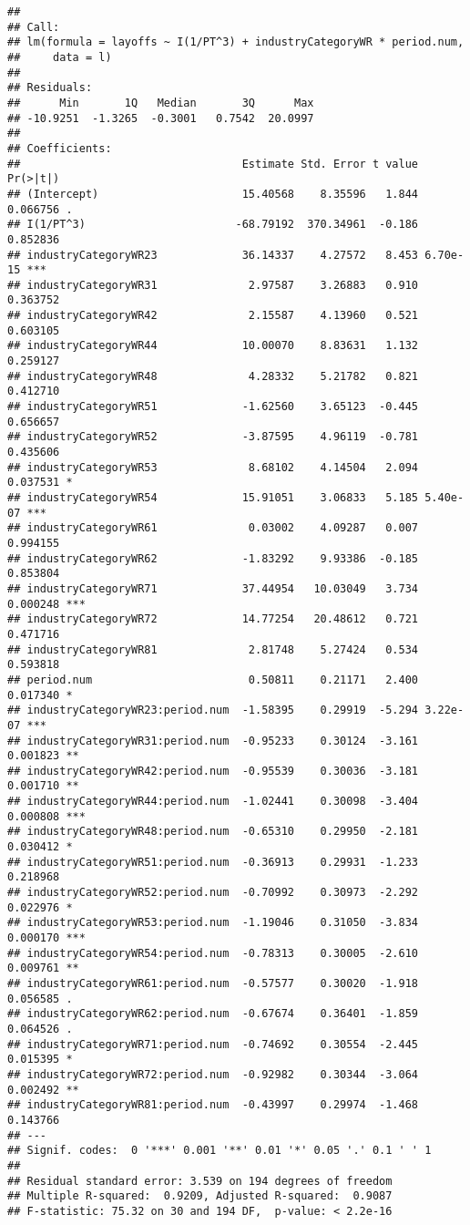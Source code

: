 \documentclass[
]{article}
\begin{document}
\begin{verbatim}
## 
## Call:
## lm(formula = layoffs ~ I(1/PT^3) + industryCategoryWR * period.num, 
##     data = l)
## 
## Residuals:
##      Min       1Q   Median       3Q      Max 
## -10.9251  -1.3265  -0.3001   0.7542  20.0997 
## 
## Coefficients:
##                                  Estimate Std. Error t value Pr(>|t|)    
## (Intercept)                      15.40568    8.35596   1.844 0.066756 .  
## I(1/PT^3)                       -68.79192  370.34961  -0.186 0.852836    
## industryCategoryWR23             36.14337    4.27572   8.453 6.70e-15 ***
## industryCategoryWR31              2.97587    3.26883   0.910 0.363752    
## industryCategoryWR42              2.15587    4.13960   0.521 0.603105    
## industryCategoryWR44             10.00070    8.83631   1.132 0.259127    
## industryCategoryWR48              4.28332    5.21782   0.821 0.412710    
## industryCategoryWR51             -1.62560    3.65123  -0.445 0.656657    
## industryCategoryWR52             -3.87595    4.96119  -0.781 0.435606    
## industryCategoryWR53              8.68102    4.14504   2.094 0.037531 *  
## industryCategoryWR54             15.91051    3.06833   5.185 5.40e-07 ***
## industryCategoryWR61              0.03002    4.09287   0.007 0.994155    
## industryCategoryWR62             -1.83292    9.93386  -0.185 0.853804    
## industryCategoryWR71             37.44954   10.03049   3.734 0.000248 ***
## industryCategoryWR72             14.77254   20.48612   0.721 0.471716    
## industryCategoryWR81              2.81748    5.27424   0.534 0.593818    
## period.num                        0.50811    0.21171   2.400 0.017340 *  
## industryCategoryWR23:period.num  -1.58395    0.29919  -5.294 3.22e-07 ***
## industryCategoryWR31:period.num  -0.95233    0.30124  -3.161 0.001823 ** 
## industryCategoryWR42:period.num  -0.95539    0.30036  -3.181 0.001710 ** 
## industryCategoryWR44:period.num  -1.02441    0.30098  -3.404 0.000808 ***
## industryCategoryWR48:period.num  -0.65310    0.29950  -2.181 0.030412 *  
## industryCategoryWR51:period.num  -0.36913    0.29931  -1.233 0.218968    
## industryCategoryWR52:period.num  -0.70992    0.30973  -2.292 0.022976 *  
## industryCategoryWR53:period.num  -1.19046    0.31050  -3.834 0.000170 ***
## industryCategoryWR54:period.num  -0.78313    0.30005  -2.610 0.009761 ** 
## industryCategoryWR61:period.num  -0.57577    0.30020  -1.918 0.056585 .  
## industryCategoryWR62:period.num  -0.67674    0.36401  -1.859 0.064526 .  
## industryCategoryWR71:period.num  -0.74692    0.30554  -2.445 0.015395 *  
## industryCategoryWR72:period.num  -0.92982    0.30344  -3.064 0.002492 ** 
## industryCategoryWR81:period.num  -0.43997    0.29974  -1.468 0.143766    
## ---
## Signif. codes:  0 '***' 0.001 '**' 0.01 '*' 0.05 '.' 0.1 ' ' 1
## 
## Residual standard error: 3.539 on 194 degrees of freedom
## Multiple R-squared:  0.9209, Adjusted R-squared:  0.9087 
## F-statistic: 75.32 on 30 and 194 DF,  p-value: < 2.2e-16
\end{verbatim}
\end{document}
